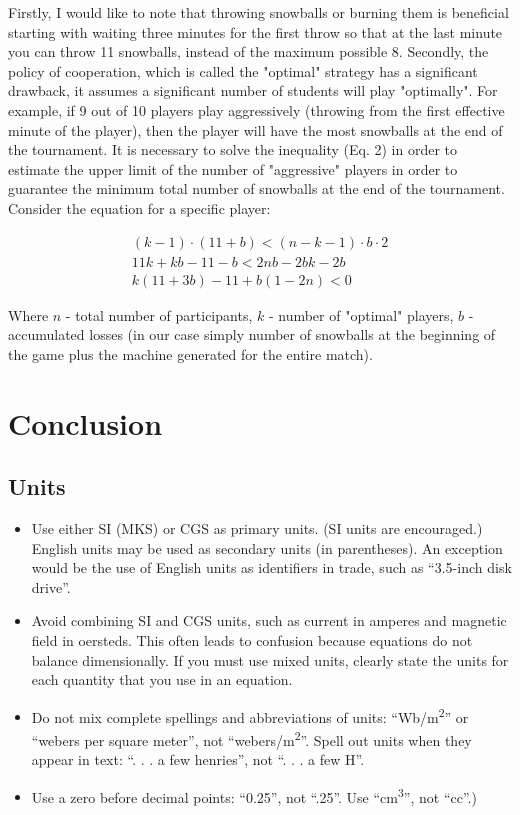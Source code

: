 \documentclass[conference]{IEEEtran}
\begin{document}
Firstly, I would like to note that throwing snowballs or burning them is beneficial starting with waiting three minutes for the first throw so that at the last minute you can throw 11 snowballs, instead of the maximum possible 8. Secondly, the policy of cooperation, which is called the "optimal" strategy has a significant drawback, it assumes a significant number of students will play "optimally". For example, if 9 out of 10 players play aggressively (throwing from the first effective minute of the player), then the player will have the most snowballs at the end of the tournament. It is necessary to solve the inequality (Eq. 2) in order to estimate the upper limit of the number of "aggressive" players in order to guarantee the minimum total number of snowballs at the end of the tournament. Consider the equation for a specific player:

\begin{equation}
\begin{split}
(k - 1) \cdot (11 + b) < (n - k - 1) \cdot b \cdot 2\\
11k + kb - 11 - b < 2nb - 2bk - 2b\\
k(11 + 3b) - 11 + b(1 - 2n) < 0
\end{split}
\end{equation}

Where $n$ - total number of participants, $k$ - number of "optimal" players, $b$ - accumulated losses (in our case simply number of snowballs at the beginning of the game plus the machine generated for the entire match).

\section{Conclusion}

\subsection{Units}
\begin{itemize}
\item Use either SI (MKS) or CGS as primary units. (SI units are encouraged.) English units may be used as secondary units (in parentheses). An exception would be the use of English units as identifiers in trade, such as ``3.5-inch disk drive''.
\item Avoid combining SI and CGS units, such as current in amperes and magnetic field in oersteds. This often leads to confusion because equations do not balance dimensionally. If you must use mixed units, clearly state the units for each quantity that you use in an equation.
\item Do not mix complete spellings and abbreviations of units: ``Wb/m\textsuperscript{2}'' or ``webers per square meter'', not ``webers/m\textsuperscript{2}''. Spell out units when they appear in text: ``. . . a few henries'', not ``. . . a few H''.
\item Use a zero before decimal points: ``0.25'', not ``.25''. Use ``cm\textsuperscript{3}'', not ``cc''.)
\end{itemize}
\end{document}
